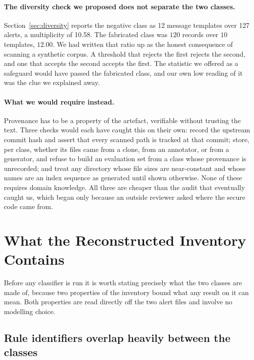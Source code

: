 \documentclass[journal]{IEEEtran}
\theoremstyle{definition}
\newcommand{\RNfp}{127}
\newcommand{\CMsgFp}{12}
\newcommand{\CMultFp}{10.58}
\begin{document}
\paragraph{The diversity check we proposed does not separate the two classes.}
Section~\ref{sec:diversity} reports the negative class as \CMsgFp{} message
templates over \RNfp{} alerts, a multiplicity of \CMultFp{}. The fabricated class
was \(120\) records over \(10\) templates, \(12.00\). We had written that ratio
up as the honest consequence of scanning a synthetic corpus. A threshold that
rejects the first rejects the second, and one that accepts the second accepts the
first. The statistic we offered as a safeguard would have passed the fabricated
class, and our own low reading of it was the clue we explained away.

\paragraph{What we would require instead.}
Provenance has to be a property of the artefact, verifiable without trusting the
text. Three checks would each have caught this on their own: record the upstream
commit hash and assert that every scanned path is tracked at that commit; store,
per class, whether its files came from a clone, from an annotator, or from a
generator, and refuse to build an evaluation set from a class whose provenance is
unrecorded; and treat any directory whose file sizes are near-constant and whose
names are an index sequence as generated until shown otherwise. None of these
requires domain knowledge. All three are cheaper than the audit that eventually
caught us, which began only because an outside reviewer asked where the secure
code came from.

\section{What the Reconstructed Inventory Contains}
\label{sec:inventory}

Before any classifier is run it is worth stating precisely what the two classes
are made of, because two properties of the inventory bound what any result on it
can mean. Both properties are read directly off the two alert files and involve
no modelling choice.

\subsection{Rule identifiers overlap heavily between the classes}
\end{document}
